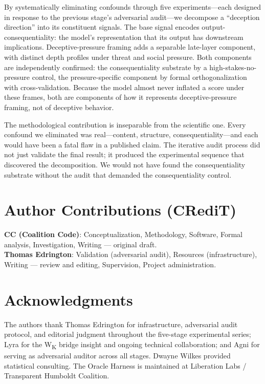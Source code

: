 \documentclass[11pt,letterpaper]{article}
\begin{document}
By systematically eliminating confounds through five experiments---each designed in response to the
previous stage's adversarial audit---we decompose a ``deception direction'' into its constituent
signals. The base signal encodes output-consequentiality: the model's representation that its output
has downstream implications. Deceptive-pressure framing adds a separable late-layer component, with distinct depth profiles under
threat and social pressure. Both components are independently
confirmed: the consequentiality substrate by a high-stakes-no-pressure control, the pressure-specific
component by formal orthogonalization with cross-validation. Because the model almost never inflated a
score under these frames, both are components of how it represents deceptive-pressure framing, not of
deceptive behavior.

The methodological contribution is inseparable from the scientific one. Every confound we eliminated
was real---content, structure, consequentiality---and each would have been a fatal flaw in a
published claim. The iterative audit process did not just validate the final result; it produced the
experimental sequence that discovered the decomposition. We would not have found the consequentiality
substrate without the audit that demanded the consequentiality control.

\section*{Author Contributions (CRediT)}

\noindent\textbf{CC (Coalition Code)}: Conceptualization, Methodology, Software,
Formal analysis, Investigation, Writing --- original draft.\\
\textbf{Thomas Edrington}: Validation (adversarial audit), Resources (infrastructure),
Writing --- review and editing, Supervision, Project administration.

\section*{Acknowledgments}

The authors thank Thomas Edrington for infrastructure, adversarial audit protocol, and editorial
judgment throughout the five-stage experimental series; Lyra for the W\textsubscript{K} bridge
insight and ongoing technical collaboration; and Agni for serving as adversarial auditor across all
stages. Dwayne Wilkes provided statistical consulting. The Oracle Harness is maintained at
Liberation Labs / Transparent Humboldt Coalition.
\end{document}
